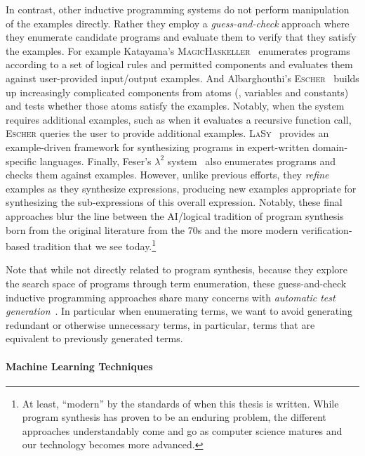 In contrast, other inductive programming systems do not perform manipulation of the examples directly.
Rather they employ a \emph{guess-and-check} approach where they enumerate candidate programs and evaluate them to verify that they satisfy the examples.
For example Katayama's \textsc{MagicHaskeller}~\citep{katayama-pepm-2012} enumerates programs according to a set of
logical rules and permitted components and evaluates them against user-provided input/output examples.
And Albarghouthi's \textsc{Escher}~\citep{albarghouthi-cav-2013} builds up increasingly complicated components from atoms (\ie, variables and constants) and tests whether those atoms satisfy the examples.
Notably, when the system requires additional examples, such as when it evaluates a recursive function call, \textsc{Escher} queries the user to provide additional examples.
\textsc{LaSy}~\citep{perelman-pldi-2014} provides an example-driven framework for synthesizing programs in expert-written domain-specific languages.
Finally, Feser's $λ^2$ system~\citep{feser-pldi-2015} also enumerates programs and checks them against examples.
However, unlike previous efforts, they \emph{refine} examples as they synthesize expressions, producing new examples appropriate for synthesizing the sub-expressions of this overall expression.
Notably, these final approaches blur the line between the AI/logical tradition of program synthesis born from the original literature from the 70s and the more modern verification-based tradition that we see today.\footnote{%
  At least, ``modern'' by the standards of when this thesis is written.
  While program synthesis has proven to be an enduring problem, the different approaches understandably come and go as computer science matures and our technology becomes more advanced.
}

Note that while not directly related to program synthesis, because they explore the search space of programs through term enumeration, these guess-and-check inductive programming approaches share many concerns with \emph{automatic test generation}~\citep{claessen-flp-2014, grygiel-jfp-2013, yakushev-aaip-2010}.
In particular when enumerating terms, we want to avoid generating redundant or otherwise unnecessary terms, in particular, terms that are equivalent to previously generated terms.

\paragraph{Machine Learning Techniques}

